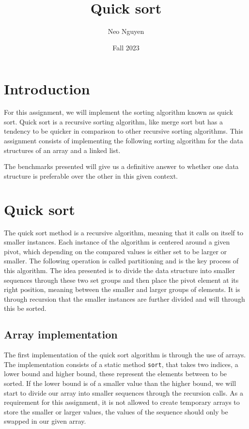 \documentclass[a4paper,11pt]{article}
\begin{document}
\title{
    \textbf{Quick sort}
}
\author{Neo Nguyen}
\date{Fall 2023}

\maketitle

\section*{Introduction}

    For this assignment, we will implement the sorting algorithm known as quick sort. Quick sort is a recursive sorting algorithm, like merge sort but has a tendency to be quicker in comparison to other recursive sorting algorithms. This assignment consists of implementing the following sorting algorithm for the data structures of an array and a linked list. 
    
    The benchmarks presented will give us a definitive answer to whether one data structure is preferable over the other in this given context.
    
\section*{Quick sort}

    The quick sort method is a recursive algorithm, meaning that it calls on itself to smaller instances. Each instance of the algorithm is centered around a given pivot, which depending on the compared values is either set to be larger or smaller. The following operation is called partitioning and is the key process of this algorithm. The idea presented is to divide the data structure into smaller sequences through these two set groups and then place the pivot element at its right position, meaning between the smaller and larger groups of elements. It is through recursion that the smaller instances are further divided and will through this be sorted.

    \subsection*{Array implementation}

        The first implementation of the quick sort algorithm is through the use of arrays. The implementation consists of a static method \texttt{sort}, that takes two indices, a lower bound and higher bound, these represent the elements between to be sorted. If the lower bound is of a smaller value than the higher bound, we will start to divide our array into smaller sequences through the recursion calls. As a requirement for this assignment, it is not allowed to create temporary arrays to store the smaller or larger values, the values of the sequence should only be swapped in our given array. 
\end{document}
